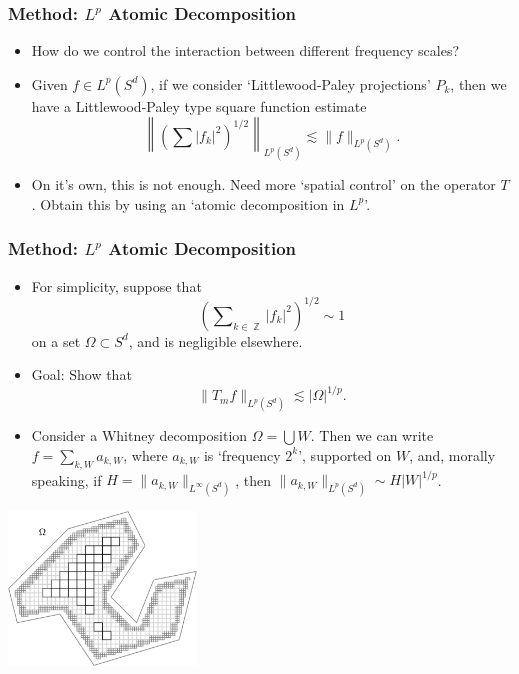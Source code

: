 \documentclass[usenames,dvipsnames,10pt]{beamer}
\DeclareMathOperator{\ZZ}{\mathbb{Z}}
\begin{document}
\begin{frame}
    \frametitle{Method: $L^p$ Atomic Decomposition}

    \begin{itemize}
        \item How do we control the interaction between different frequency scales?

        \pause
        \item Given $f \in L^p(S^d)$, if we consider `Littlewood-Paley projections' $P_k$, then we have a Littlewood-Paley type square function estimate
        \[ \left\| \left( \sum |f_k|^2 \right)^{1/2} \right\|_{L^p(S^d)} \lesssim \| f \|_{L^p(S^d)}. \]

        \pause
        \item On it's own, this is not enough. Need more `spatial control' on the operator $T$. Obtain this by using an `atomic decomposition in $L^p$'.
    \end{itemize}
\end{frame}

\begin{frame}
    \frametitle{Method: $L^p$ Atomic Decomposition}

    \small
    \begin{itemize}
        \item For simplicity, suppose that
        \[ \left( \sum\nolimits_{k \in \ZZ} |f_k|^2 \right)^{1/2} \sim 1 \]
        on a set $\Omega \subset S^d$, and is negligible elsewhere.

        \pause
        \item Goal: Show that
        \[ \| T_mf \|_{L^p(S^d)} \lesssim |\Omega|^{1/p}. \]

        \pause
        \item Consider a Whitney decomposition $\Omega = \bigcup W$. Then we can write $f = \sum_{k,W} a_{k,W}$, where $a_{k,W}$ is `frequency $2^k$', supported on $W$, and, morally speaking, if $H = \| a_{k,W} \|_{L^\infty(S^d)}$, then $\| a_{k,W} \|_{L^p(S^d)} \sim H |W|^{1/p}$.
    \end{itemize}
    \pause

    \centering
    \includegraphics[width=5cm]{449605_1_En_6_Fig1_HTML.png}
\end{frame}
\end{document}
